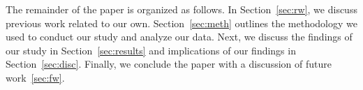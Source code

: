 \documentclass[conference]{IEEEtran}
\begin{document}
The remainder of the paper is organized as follows. In Section~\ref{sec:rw}, we discuss previous work related to our own. Section~\ref{sec:meth} outlines the methodology we used to conduct our study and analyze our data. Next, we discuss the findings of our study in Section~\ref{sec:results} and implications of our findings in Section~\ref{sec:disc}. Finally, we conclude the paper with a discussion of future work~\ref{sec:fw}.



%
%



%
%
\end{document}
